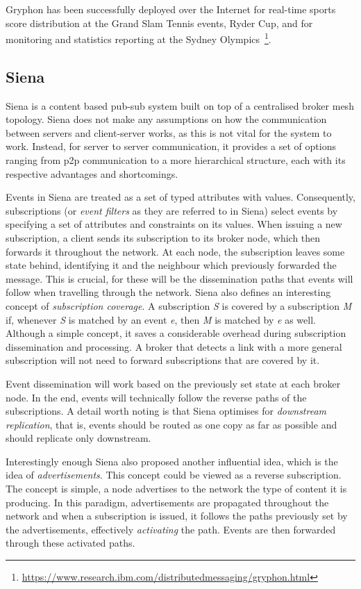Gryphon has been successfully deployed over the Internet for real-time
sports score distribution at the Grand Slam Tennis events, Ryder Cup,
and for monitoring and statistics reporting at the Sydney Olympics~\footnote{\url{https://www.research.ibm.com/distributedmessaging/gryphon.html}}.

\subsection{Siena}\label{siena}

Siena \cite{Carzaniga2003} is a content based pub-sub system built
on top of a centralised broker mesh topology. Siena does not make any
assumptions on how the communication between servers and client-server
works, as this is not vital for the system to work. Instead, for server
to server communication, it provides a set of options ranging from \acrshort{p2p}
communication to a more hierarchical structure, each with its respective
advantages and shortcomings.

Events in Siena are treated as a set of typed attributes with values.
Consequently, subscriptions (or \emph{event filters} as they are
referred to in Siena) select events by specifying a set of attributes
and constraints on its values. When issuing a new subscription, a client
sends its subscription to its broker node, which then forwards it
throughout the network. At each node, the subscription leaves some state
behind, identifying it and the neighbour which previously forwarded the
message. This is crucial, for these will be the dissemination paths that
events will follow when travelling through the network. Siena also
defines an interesting concept of \emph{subscription coverage}. A
subscription \emph{S} is covered by a subscription \emph{M} if, whenever
\emph{S} is matched by an event \emph{e}, then \emph{M} is matched by
\emph{e} as well. Although a simple concept, it saves a considerable
overhead during subscription dissemination and processing. A broker that
detects a link with a more general subscription will not need to forward
subscriptions that are covered by it.

Event dissemination will work based on the previously set state at each
broker node. In the end, events will technically follow the reverse paths
of the subscriptions. A detail worth noting is that Siena optimises for
\emph{downstream replication}, that is, events should be routed as one
copy as far as possible and should replicate only downstream.

Interestingly enough Siena also proposed another influential idea, which
is the idea of \emph{advertisements}. This concept could be viewed as a
reverse subscription. The concept is simple, a node advertises to the
network the type of content it is producing. In this paradigm,
advertisements are propagated throughout the network and when a
subscription is issued, it follows the paths previously set by the
advertisements, effectively \emph{activating} the path. Events are then
forwarded through these activated paths.


